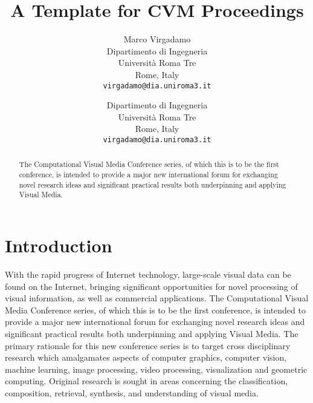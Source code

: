 \documentclass[10pt,twocolumn,letterpaper]{article}
\begin{document}
\title{A Template for CVM Proceedings}

\author{Marco Virgadamo\\
Dipartimento di Ingegneria\\
Universit\`a Roma Tre\\
Rome, Italy\\
{\tt\small virgadamo@dia.uniroma3.it}
\and
Dipartimento di Ingegneria\\
Universit\`a Roma Tre\\
Rome, Italy\\
{\tt\small virgadamo@dia.uniroma3.it}
}

\maketitle

\begin{abstract}
    The Computational Visual Media Conference series, of which this is to be the first conference, is intended to provide a major new international forum for exchanging novel research ideas and significant practical results both underpinning and applying Visual Media.
\end{abstract}

\section{Introduction}

With the rapid progress of Internet technology, large-scale visual data can be found on the Internet, bringing significant opportunities for novel processing of visual information, as well as commercial applications.
The Computational Visual Media Conference series, of which this is to be the first conference, is intended to provide a major new international forum for exchanging novel research ideas and significant practical results both underpinning and applying Visual Media. The primary rationale for this new conference series is to target cross disciplinary research which amalgamates aspects of computer graphics, computer vision, machine learning, image processing, video processing, visualization and geometric computing. Original research is sought in areas concerning the classification, composition, retrieval, synthesis, and understanding of visual media.
\end{document}
